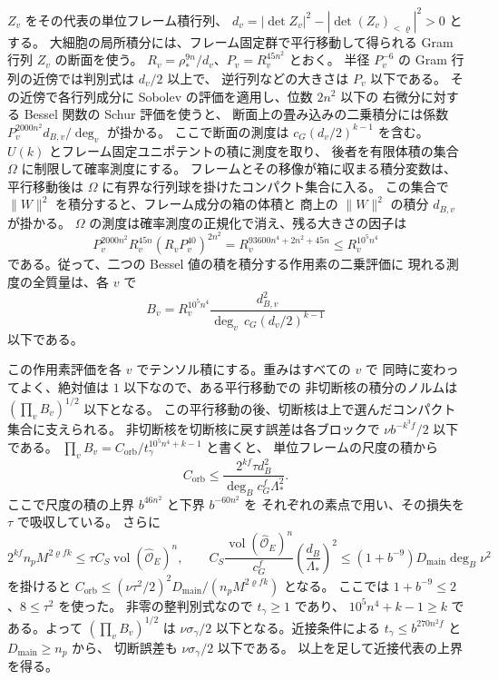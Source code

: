 \(Z_v\) をその代表の単位フレーム積行列、
\(d_v=|\det Z_v|^2-|\det (Z_v)_{<\varrho}|^2>0\) とする。
大細胞の局所積分には、フレーム固定群で平行移動して得られる
Gram 行列 \(Z_v\) の断面を使う。
\(R_v=\rho_\ast^{9n}/d_v\)、\(P_v=R_v^{45n^2}\) とおく。
半径 \(P_v^{-6}\) の Gram 行列の近傍では判別式は \(d_v/2\) 以上で、
逆行列などの大きさは \(P_v\) 以下である。
その近傍で各行列成分に Sobolev の評価を適用し、位数 \(2n^2\) 以下の
右微分に対する Bessel 関数の Schur 評価を使うと、
断面上の畳み込みの二乗積分には係数
\(P_v^{2000n^2}d_{B,v}/\deg_v\) が掛かる。
ここで断面の測度は \(c_G(d_v/2)^{k-1}\) を含む。
\(U(k)\) とフレーム固定ユニポテントの積に測度を取り、
後者を有限体積の集合 \(\Omega\) に制限して確率測度にする。
フレームとその移像が箱に収まる積分変数は、平行移動後は
\(\Omega\) に有界な行列球を掛けたコンパクト集合に入る。
この集合で \(\|W\|^2\) を積分すると、フレーム成分の箱の体積と
商上の \(\|W\|^2\) の積分 \(d_{B,v}\) が掛かる。
\(\Omega\) の測度は確率測度の正規化で消え、残る大きさの因子は
\[
 P_v^{2000n^2}R_v^{45n}
        (R_vP_v^{40})^{2n^2}
 =R_v^{93600n^4+2n^2+45n}
 \le R_v^{10^5 n^4}
\]
である。従って、二つの Bessel 値の積を積分する作用素の二乗評価に
現れる測度の全質量は、各 \(v\) で
\[
 B_v=R_v^{10^5 n^4}
      \frac{d_{B,v}^2}{\deg_v\,c_G(d_v/2)^{k-1}}
\]
以下である。

この作用素評価を各 \(v\) でテンソル積にする。重みはすべての \(v\) で
同時に変わってよく、絶対値は \(1\) 以下なので、ある平行移動での
非切断核の積分のノルムは \((\prod_v B_v)^{1/2}\) 以下となる。
この平行移動の後、切断核は上で選んだコンパクト集合に支えられる。
非切断核を切断核に戻す誤差は各ブロックで \(\nu b^{-k^3f}/2\) 以下である。
\(\prod_v B_v=C_{\mathrm{orb}}/t_\gamma^{10^5n^4+k-1}\) と書くと、
単位フレームの尺度の積から
\[
 C_{\mathrm{orb}}\le
 \frac{2^{kf}\tau d_B^2}{\deg_B c_G^f\Lambda_\ast^2}.
\]
ここで尺度の積の上界 \(b^{46n^2}\) と下界 \(b^{-60n^2}\) を
それぞれの素点で用い、その損失を \(\tau\) で吸収している。
さらに
\[
 2^{kf}n_pM^{2\varrho fk}
 \le\tau C_S\operatorname{vol}(\widehat{\mathcal O}_E)^n,\qquad
 C_S\frac{\operatorname{vol}(\widehat{\mathcal O}_E)^n}{c_G^f}
     \left(\frac{d_B}{\Lambda_\ast}\right)^2
 \le(1+b^{-9})D_{\mathrm{main}}\deg_B\nu^2
\]
を掛けると
\(C_{\mathrm{orb}}\le (\nu\tau^2/2)^2
 D_{\mathrm{main}}/(n_pM^{2\varrho fk})\) となる。
ここでは \(1+b^{-9}\le2\)、\(8\le\tau^2\) を使った。
非零の整判別式なので \(t_\gamma\ge1\) であり、
\(10^5n^4+k-1\ge k\) である。よって \((\prod_v B_v)^{1/2}\)
は \(\nu\sigma_\gamma/2\) 以下となる。近接条件による
\(t_\gamma\le b^{270n^2f}\) と \(D_{\mathrm{main}}\ge n_p\) から、
切断誤差も \(\nu\sigma_\gamma/2\) 以下である。
以上を足して近接代表の上界を得る。

